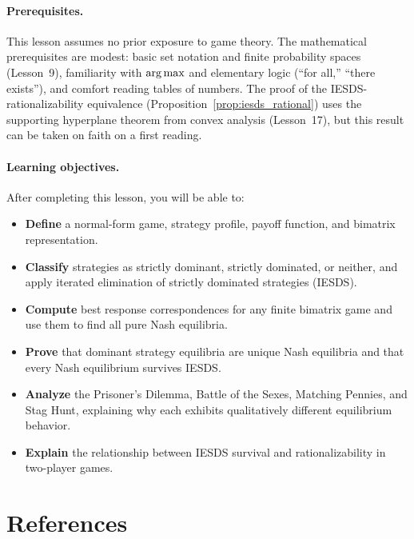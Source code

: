 \documentclass[11pt,a4paper]{article}
\begin{document}
\paragraph{Prerequisites.}
This lesson assumes no prior exposure to game theory.  The mathematical
prerequisites are modest: basic set notation and finite probability spaces
(Lesson~9), familiarity with $\operatorname{arg\,max}$ and elementary logic (``for all,''
``there exists''), and comfort reading tables of numbers.  The proof of the
IESDS-rationalizability equivalence (Proposition~\ref{prop:iesds_rational})
uses the supporting hyperplane theorem from convex analysis (Lesson~17),
but this result can be taken on faith on a first reading.

\paragraph{Learning objectives.}
After completing this lesson, you will be able to:
\begin{itemize}[nosep]
    \item \textbf{Define} a normal-form game, strategy profile, payoff
    function, and bimatrix representation.
    \item \textbf{Classify} strategies as strictly dominant, strictly
    dominated, or neither, and apply iterated elimination of strictly
    dominated strategies (IESDS).
    \item \textbf{Compute} best response correspondences for any finite
    bimatrix game and use them to find all pure Nash equilibria.
    \item \textbf{Prove} that dominant strategy equilibria are unique Nash
    equilibria and that every Nash equilibrium survives IESDS.
    \item \textbf{Analyze} the Prisoner's Dilemma, Battle of the Sexes,
    Matching Pennies, and Stag Hunt, explaining why each exhibits
    qualitatively different equilibrium behavior.
    \item \textbf{Explain} the relationship between IESDS survival and
    rationalizability in two-player games.
\end{itemize}


\section{References}
\label{sec:references}
\end{document}
